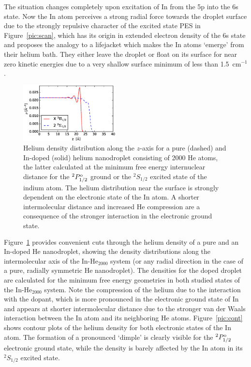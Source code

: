 \documentclass[twoside,twocolumn,9pt]{article}
\begin{document}

The situation changes completely upon excitation of In from the 5p into the 6s state. Now the In atom perceives a strong radial force towards the droplet surface due to the strongly repulsive character of the excited state PES in Figure~\ref{pic:scan}, which has its origin in extended electron density of the 6s state and proposes the analogy to a lifejacket which makes the In atoms `emerge' from their helium bath. They either leave the droplet or float on its surface for near zero kinetic energies due to a very shallow surface minimum of less than 1.5~cm$^{-1}$.

\begin{figure}[htbp]
  	\begin{center}
 		\includegraphics[width=0.45\textwidth]{4.eps}
                \caption{Helium density distribution along the $z$-axis for a pure (dashed) and In-doped (solid) helium nanodroplet consisting of 2000 He atoms, the latter calculated at the minimum free energy internuclear distance for the $^2P^{\rm o}_{1/2}$ ground or the $^2S_{1/2}$ excited state of the indium atom. The helium distribution near the surface is strongly dependent on the electronic state of the In atom. A shorter intermolecular distance and increased He compression are a consequence of the stronger interaction in the electronic ground state.\label{pic:cut}}
  	\end{center}
\end{figure}

Figure~\ref{pic:cut} provides convenient cuts through the helium density of a pure and an In-doped He nanodroplet, showing the density distributions along the intermolecular axis of the In-He$_{2000}$ system (or any radial direction in the case of a pure,  radially symmetric He nanodroplet). The densities for the doped droplet are calculated for the minimum free energy geometries in both studied states of the In-He$_{2000}$ system. Note the compression of the helium due to the interaction with the dopant, which is more pronounced in the electronic ground state of In and appears at shorter intermolecular distance due to the stronger van der Waals interaction between the In atom and its neighboring He atoms. Figure~\ref{pic:cont} shows contour plots of the helium density for both electronic states of the In atom. The formation of a pronounced `dimple' is clearly visible for the $^2P^{\rm o}_{1/2}$ electronic ground state, while the density is barely affected by the In atom in its $^2S_{1/2}$ excited state. 
\end{document}
